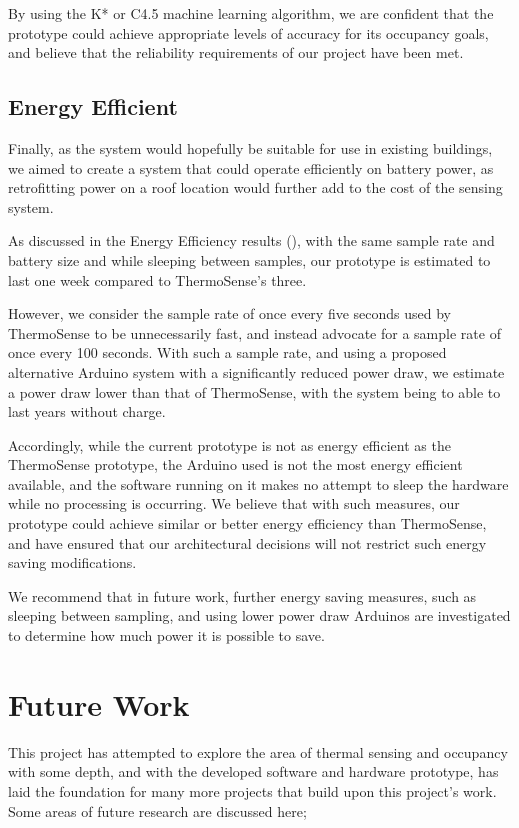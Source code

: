 \documentclass[../thesis/thesis.tex]{subfiles}
\begin{document}
By using the K* or C4.5 machine learning algorithm, we are confident that the prototype could achieve appropriate levels of accuracy for its occupancy goals, and believe that the reliability requirements of our project have been met.

\subsection{Energy Efficient}
Finally, as the system would hopefully be suitable for use in existing buildings, we aimed to create a system that could operate efficiently on battery power, as retrofitting power on a roof location would further add to the cost of the sensing system.

As discussed in the Energy Efficiency results (), with the same sample rate and battery size and while sleeping between samples, our prototype is estimated to last one week compared to ThermoSense's three.

However, we consider the sample rate of once every five seconds used by ThermoSense to be unnecessarily fast, and instead advocate for a sample rate of once every 100 seconds. With such a sample rate, and using a proposed alternative Arduino system with a significantly reduced power draw, we estimate a power draw lower than that of ThermoSense, with the system being to able to last years without charge. %

Accordingly, while the current prototype is not as energy efficient as the ThermoSense prototype, the Arduino used is not the most energy efficient available, and the software running on it makes no attempt to sleep the hardware while no processing is occurring. We believe that with such measures, our prototype could achieve similar or better energy efficiency than ThermoSense, and have ensured that our architectural decisions will not restrict such energy saving modifications.

We recommend that in future work, further energy saving measures, such as sleeping between sampling, and using lower power draw Arduinos are investigated to determine how much power it is possible to save.

\section{Future Work}
This project has attempted to explore the area of thermal sensing and occupancy with some depth, and with the developed software and hardware prototype, has laid the foundation for many more projects that build upon this project's work. Some areas of future research are discussed here;
\end{document}
